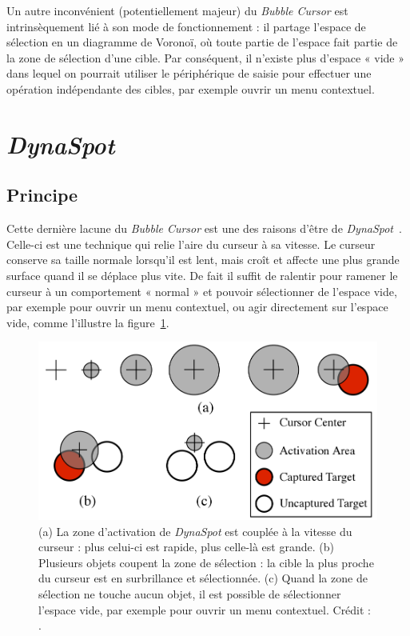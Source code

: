 	Un autre inconvénient (potentiellement majeur) du \emph{Bubble Cursor} est intrinsèquement lié à son mode de fonctionnement : il partage l'espace de sélection en un diagramme de Voronoï, où toute partie de l'espace fait partie de la zone de sélection d'une cible. Par conséquent, il n'existe plus d'espace « vide » dans lequel on pourrait utiliser le périphérique de saisie pour effectuer une opération indépendante des cibles, par exemple ouvrir un menu contextuel.

\section{\emph{DynaSpot}}
	\subsection{Principe}
	Cette dernière lacune du \emph{Bubble Cursor} est une des raisons d'être de \emph{DynaSpot}~\cite{chapuis2009dynaspot}. Celle-ci est une technique qui relie l'aire du curseur à sa vitesse. Le curseur conserve sa taille normale lorsqu'il est lent, mais croît et affecte une plus grande surface quand il se déplace plus vite. De fait il suffit de ralentir pour ramener le curseur à un comportement « normal » et pouvoir sélectionner de l'espace vide, par exemple pour ouvrir un menu contextuel, ou agir directement sur l'espace vide, comme l'illustre la figure~\ref{fig:dynaSpot}.
	
	\begin{figure}[H]
		\centering
		\includegraphics[width=\textwidth]{figures/ch2/dynaSpot}
		\caption{(a) La zone d'activation de \emph{DynaSpot} est couplée à la vitesse du curseur : plus celui-ci est rapide, plus celle-là est grande. (b) Plusieurs objets coupent la zone de sélection : la cible la plus proche du curseur est en surbrillance et sélectionnée. (c) Quand la zone de sélection ne touche aucun objet, il est possible de sélectionner l'espace vide, par exemple pour ouvrir un menu contextuel. Crédit : \cite{chapuis2009dynaspot}.}
		\label{fig:dynaSpot}
	\end{figure}
	
